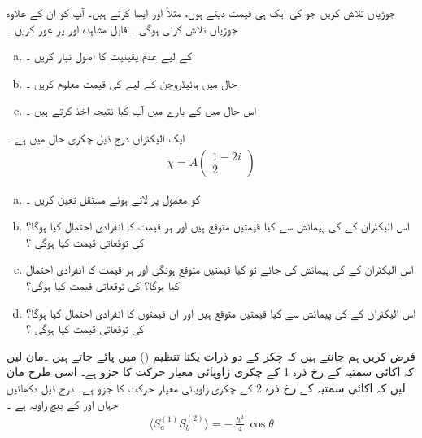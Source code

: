   جوڑیاں  تلاش کریں جو  کی ایک ہی قیمت دیتے ہوں،  مثلاً   اور  ایسا کرتے ہیں۔ آپ کو ان کے علاوہ جوڑیاں تلاش کرنی ہوگی ۔
قابل مشاہدہ   اور  پر غور کریں ۔
\begin{enumerate}[a.]
\item
{} کے لیے عدم یقینیت کا اصول تیار کریں ۔
\item
حال  میں ہائیڈروجن کے لیے  کی قیمت معلوم کریں ۔
\item
اس حال میں  کے بارے میں آپ کیا نتیجہ اخذ کرتے ہیں ۔
\end{enumerate}
ایک الیکٹران درج ذیل چکری حال میں ہے ۔
\begin{align*}
\chi = A
\begin{pmatrix}
1 - 2i \\
2
\end{pmatrix}
\end{align*}
\begin{enumerate}[a.]
\item
{} کو معمول پر لاتے ہوئے مستقل  تعین کریں ۔
\item
اس الیکٹران کے   کی پیمائش سے کیا قیمتیں متوقع ہیں اور ہر قیمت کا انفرادی احتمال کیا ہوگا؟   کی توقعاتی قیمت کیا ہوگی ؟
\item
 اس الیکٹران کے  کی پیمائش کی جائے تو کیا  قیمتیں  متوقع ہونگی اور ہر قیمت کا انفرادی احتمال کیا ہوگا؟  کی توقعاتی قیمت کیا ہوگی؟ 
\item
اس الیکٹران کے   کی پیمائش سے کیا  قیمتیں  متوقع ہیں اور ان قیمتوں کا انفرادی احتمال کیا ہوگا؟   کی توقعاتی قیمت کیا ہوگی ؟
\end{enumerate}
فرض کریں  ہم جانتے ہیں کہ   چکر کے دو  ذرات یکتا تنظیم   () میں پائے جاتے ہیں ۔مان لیں کہ اکائی سمتیہ    کے رخ ذرہ 1 کے چکری زاویائی معیار حرکت کا جزو   ہے۔ اسی طرح مان لیں کہ اکائی سمتیہ    کے رخ ذرہ 2 کے چکری زاویائی معیار حرکت کا جزو   ہے۔ درج ذیل دکھائیں جہاں  اور  کے بیچ زاویہ  ہے ۔
\begin{align}
    \langle S_{a}^{(1)}S_{b}^{(2)}\rangle=-\frac{\hslash^{2}}{4}\cos\theta
\end{align}
